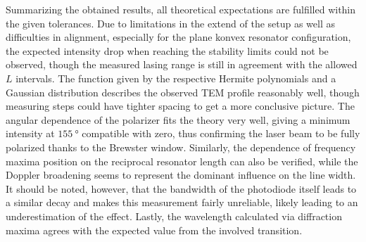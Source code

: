 Summarizing the obtained results, all theoretical expectations are fulfilled within the given tolerances. Due to limitations in the extend
of the setup as well as difficulties in alignment, especially for the plane konvex resonator configuration, the expected intensity drop when
reaching the stability limits could not be observed, though the measured lasing range is still in agreement with the allowed $L$ intervals.
The function given by the respective Hermite polynomials and a Gaussian distribution describes the observed TEM profile reasonably well,
though measuring steps could have tighter spacing to get a more conclusive picture. The angular dependence of the polarizer fits the theory
very well, giving a minimum intensity at $\qty{155}{\degree}$ compatible with zero, thus confirming the laser beam to be fully polarized thanks
to the Brewster window. Similarly, the dependence of frequency maxima position on the reciprocal resonator length can also be verified, while
the Doppler broadening seems to represent the dominant influence on the line width. It should be noted, however, that the bandwidth of the
photodiode itself leads to a similar decay and makes this measurement fairly unreliable, likely leading to an underestimation of the effect.
Lastly, the wavelength calculated via diffraction maxima agrees with the expected value from the involved transition.
